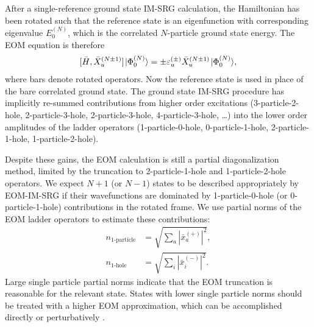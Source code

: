 \documentclass[thesis.tex]{subfiles}
\begin{document}
After a single-reference ground state IM-SRG calculation, the Hamiltonian has been rotated such that the reference state is an eigenfunction with corresponding eigenvalue $E^{(N)}_0$, which is the correlated $N$-particle ground state energy. The EOM equation is therefore
\begin{align} \label{eq:EOMIMSRG}
  [\bar{H},\bar{X}^{(N \pm 1)}_u] \hspace{1pt}\lvert \Phi^{(N)}_0 \rangle = \pm \varepsilon^{(\pm)}_u \bar{X}^{(N \pm 1)}_u \hspace{1pt}\lvert \Phi^{(N)}_0 \rangle,
\end{align}
where bars denote rotated operators. Now the reference state is used in place of the bare correlated ground state. The ground state IM-SRG procedure has implicitly re-summed contributions from higher order excitations (3-particle-2-hole, 2-particle-3-hole, 2-particle-3-hole, 4-particle-3-hole, \ldots) into the lower order amplitudes of the ladder operators (1-particle-0-hole, 0-particle-1-hole, 2-particle-1-hole, 1-particle-2-hole).

Despite these gains, the EOM calculation is still a partial diagonalization method, limited by the truncation to 2-particle-1-hole and 1-particle-2-hole operators. We expect $N + 1$ (or $N - 1$) states to be described appropriately by EOM-IM-SRG if their wavefunctions are dominated by 1-particle-0-hole (or 0-particle-1-hole) contributions in the rotated frame. We use partial norms of the EOM ladder operators to estimate these contributions:
\begin{align}
  \label{eq:partial_norms_p}
  n_{\text{1-particle}} &= \sqrt{\sum_a | \bar{x}^{(+)}_a |^2},\\
  \label{eq:partial_norms_h}
  n_{\text{1-hole}} &= \sqrt{\sum_i | \bar{x}^{(-)}_i |^2}.
\end{align}
Large single particle partial norms indicate that the EOM truncation is reasonable for the relevant state. States with lower single particle norms should be treated with a higher EOM approximation, which can be accomplished directly or perturbatively \cite{PARZUCHOWSKI2017044304}.
\end{document}

